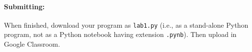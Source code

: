 \documentclass[10pt]{article}
\begin{document}
  \paragraph{Submitting:}   When finished, download your program as {\tt lab1.py} (i.e., as a stand-alone Python program, not as a Python notebook having extension {\tt.pynb}). Then upload in Google Classroom.
\end{document}
